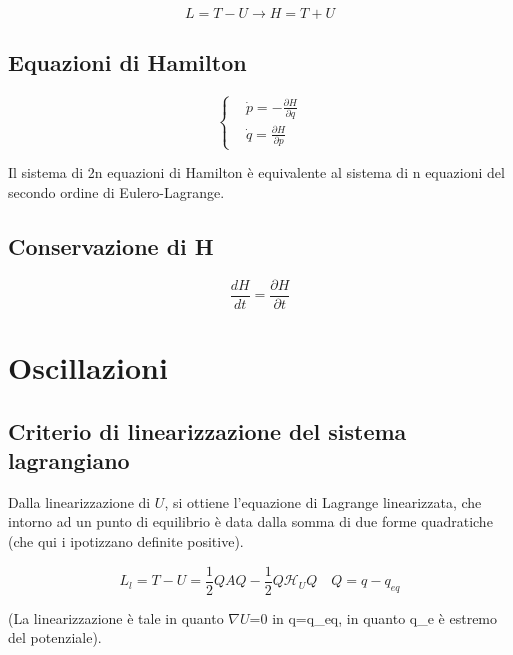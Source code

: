 \documentclass{article}
\begin{document}
            \begin{equation}
                L=T-U \rightarrow H= T+U
            \end{equation}

            \subsection{Equazioni di Hamilton}
            \begin{equation}
                \left\{
                \begin{aligned}
                     & \dot p=-\frac{\partial H}{\partial q} \\
                     & \dot q= \frac{\partial H}{\partial p}
                \end{aligned}
                \right.
            \end{equation}

            Il sistema di 2n equazioni di Hamilton è equivalente al sistema di n equazioni del secondo ordine di Eulero-Lagrange.

            \subsection{Conservazione di H}

            \begin{equation}
                \frac{d H}{dt}= \frac{\partial H}{\partial t}
            \end{equation}


            \section{Oscillazioni}
            \subsection{Criterio di linearizzazione del sistema lagrangiano}
            Dalla linearizzazione di $U$, si ottiene l'equazione di Lagrange linearizzata, che intorno ad un punto di equilibrio è data dalla somma di due forme quadratiche (che qui i ipotizzano definite positive).

            \begin{equation}
                L_l=T-U= \frac{1}{2}QAQ- \frac{1}{2}Q\mathcal{H}_UQ \quad Q=q-q_{eq}
            \end{equation}

            (La linearizzazione è tale in quanto $\nabla$$U$=0 in q=q\_{eq}, in quanto q\_e è estremo del potenziale).
\end{document}

